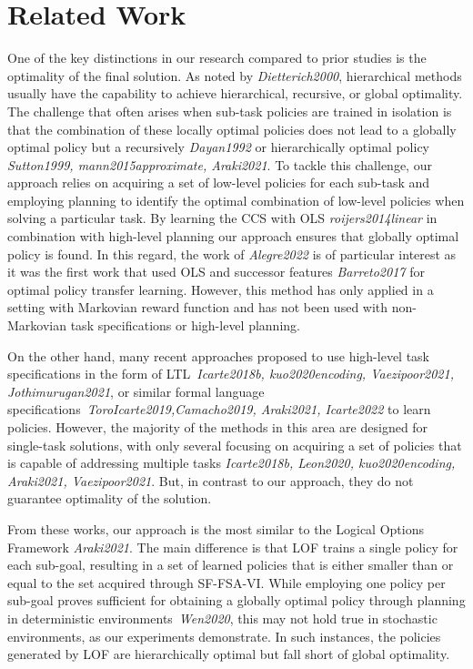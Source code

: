\section{Related Work}
One of the key distinctions in our research compared to prior studies is the optimality of the final solution. As noted by \textit{Dietterich2000}, hierarchical methods usually have the capability to achieve hierarchical, recursive, or global optimality. The challenge that often arises when sub-task policies are trained in isolation is that the combination of these locally optimal policies does not lead to a globally optimal policy but a recursively \textit{Dayan1992} or hierarchically optimal policy \textit{Sutton1999, mann2015approximate, Araki2021}.  To tackle this challenge, our approach relies on acquiring a set of low-level policies for each sub-task and employing planning to identify the optimal combination of low-level policies when solving a particular task. By learning the CCS with OLS \textit{roijers2014linear} in combination with high-level planning our approach ensures that globally optimal policy is found. In this regard, the work of \textit{Alegre2022} is of particular interest as it was the first work that used OLS and successor features \textit{Barreto2017} for optimal policy transfer learning. However, this method has only applied in a setting with Markovian reward function and has not been used with non-Markovian task specifications or high-level planning. 

On the other hand, many recent approaches proposed to use high-level task specifications in the form of LTL~\textit{Icarte2018b, kuo2020encoding, Vaezipoor2021, Jothimurugan2021}, or similar formal language specifications~\textit{ToroIcarte2019,Camacho2019, Araki2021, Icarte2022} to learn policies. However, the majority of the methods in this area are designed for single-task solutions, with only several focusing on acquiring a set of policies that is capable of addressing multiple tasks \textit{Icarte2018b, Leon2020, kuo2020encoding, Araki2021, Vaezipoor2021}. But, in contrast to our approach, they do not guarantee optimality of the solution.

From these works, our approach is the most similar to the Logical Options Framework \textit{Araki2021}. The main difference is that LOF trains a single policy for each sub-goal, resulting in a set of learned policies that is either smaller than or equal to the set acquired through SF-FSA-VI. While employing one policy per sub-goal proves sufficient for obtaining a globally optimal policy through planning in deterministic environments~\textit{Wen2020}, this may not hold true in stochastic environments, as our experiments demonstrate. In such instances, the policies generated by LOF are hierarchically optimal but fall short of global optimality.


